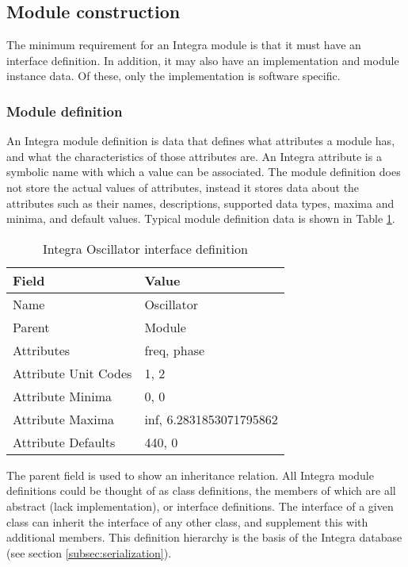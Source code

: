 {\subsection{Module construction}\label{subsec:module_construction}

The minimum requirement for an Integra module is that it must have an interface definition. In addition, it may also have an implementation and module instance data. Of these, only the implementation is software specific.

\subsubsection{Module definition}\label{subsubsec:module_definition}

An Integra module definition is data that defines what attributes a
module has, and what the characteristics of those attributes are. An
Integra attribute is a symbolic name with which a value can be
associated. The module definition does not store the actual values of
attributes, instead it stores data about the attributes such as their
names, descriptions, supported data types, maxima and minima, and
default values. Typical module definition data is shown in Table
\ref{tab:module_definition}.

\begin{table}
\begin{center}
\begin{tabular}{|l|l|}
\hline
\textbf{Field} & \textbf{Value} \\
\hline
Name  & Oscillator \\
\hline
Parent  & Module \\
\hline
Attributes & freq, phase \\
\hline
Attribute Unit Codes & 1, 2 \\
\hline
Attribute Minima & 0, 0 \\
\hline
Attribute Maxima & inf, 6.2831853071795862 \\
\hline
Attribute Defaults & 440, 0 \\
\hline
\end{tabular} 
\end{center}
\caption{Integra Oscillator interface definition}
\label{tab:module_definition}
\end{table}

The parent field is used to show an inheritance relation. All Integra module definitions could be thought of as class definitions, the members of which are all abstract (lack implementation), or interface definitions. The interface of a given class can inherit the interface of any other class, and supplement this with additional members. This definition hierarchy is the basis of the Integra database (see section \ref{subsec:serialization}). 

}
